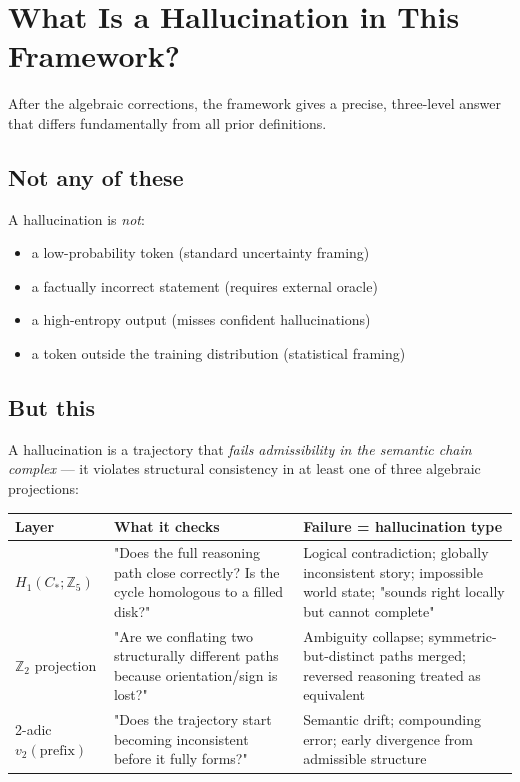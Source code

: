 \documentclass[11pt,a4paper]{article}
\begin{document}
\section{What Is a Hallucination in This Framework?}
\label{sec:hallucination_def}

After the algebraic corrections, the framework gives a precise,
three-level answer that differs fundamentally from all prior definitions.

\subsection*{Not any of these}
A hallucination is \emph{not}:
\begin{itemize}
  \item a low-probability token (standard uncertainty framing)
  \item a factually incorrect statement (requires external oracle)
  \item a high-entropy output (misses confident hallucinations)
  \item a token outside the training distribution (statistical framing)
\end{itemize}

\subsection*{But this}
A hallucination is a trajectory that \emph{fails admissibility in the
semantic chain complex} --- it violates structural consistency in at
least one of three algebraic projections:

\begin{center}
\renewcommand{\arraystretch}{1.3}
\begin{tabular}{p{3.5cm}p{4.5cm}p{4cm}}
\toprule
\textbf{Layer} & \textbf{What it checks} & \textbf{Failure = hallucination type} \\
\midrule
$H_1(C_*;\mathbb{Z}_5)$ &
  "Does the full reasoning path close correctly?
   Is the cycle homologous to a filled disk?" &
  Logical contradiction; globally inconsistent story;
  impossible world state; "sounds right locally but cannot complete" \\
$\mathbb{Z}_2$ projection &
  "Are we conflating two structurally different paths
   because orientation/sign is lost?" &
  Ambiguity collapse; symmetric-but-distinct paths merged;
  reversed reasoning treated as equivalent \\
2-adic $v_2(\text{prefix})$ &
  "Does the trajectory start becoming
   inconsistent before it fully forms?" &
  Semantic drift; compounding error;
  early divergence from admissible structure \\
\bottomrule
\end{tabular}
\end{center}
\end{document}
